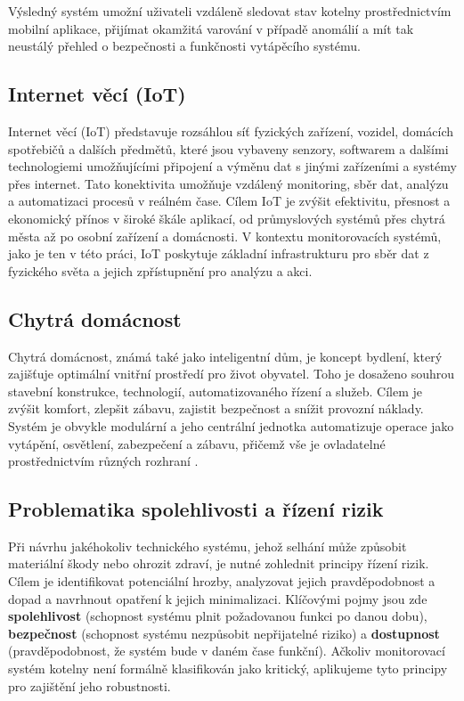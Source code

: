 \documentclass[12pt, twoside]{article} %
\begin{document}
Výsledný systém umožní uživateli vzdáleně sledovat stav kotelny prostřednictvím mobilní aplikace, přijímat okamžitá varování v případě anomálií a mít tak neustálý přehled o bezpečnosti a funkčnosti vytápěcího systému.

\subsection{Internet věcí (IoT)}
Internet věcí (IoT) představuje rozsáhlou síť fyzických zařízení, vozidel, domácích spotřebičů a dalších předmětů, které jsou vybaveny senzory, softwarem a dalšími technologiemi umožňujícími připojení a výměnu dat s jinými zařízeními a systémy přes internet. Tato konektivita umožňuje vzdálený monitoring, sběr dat, analýzu a automatizaci procesů v reálném čase. Cílem IoT je zvýšit efektivitu, přesnost a ekonomický přínos v široké škále aplikací, od průmyslových systémů přes chytrá města až po osobní zařízení a domácnosti. V kontextu monitorovacích systémů, jako je ten v této práci, IoT poskytuje základní infrastrukturu pro sběr dat z fyzického světa a jejich zpřístupnění pro analýzu a akci. \autocite{wiki:iot}

\subsection{Chytrá domácnost}
Chytrá domácnost, známá také jako inteligentní dům, je koncept bydlení, který zajišťuje optimální vnitřní prostředí pro život obyvatel. Toho je dosaženo souhrou stavební konstrukce, technologií, automatizovaného řízení a služeb. Cílem je zvýšit komfort, zlepšit zábavu, zajistit bezpečnost a snížit provozní náklady. Systém je obvykle modulární a jeho centrální jednotka automatizuje operace jako vytápění, osvětlení, zabezpečení a zábavu, přičemž vše je ovladatelné prostřednictvím různých rozhraní \autocite{wiki:inteligentni_dum}.

\subsection{Problematika spolehlivosti a řízení rizik}
Při návrhu jakéhokoliv technického systému, jehož selhání může způsobit materiální škody nebo ohrozit zdraví, je nutné zohlednit principy řízení rizik. Cílem je identifikovat potenciální hrozby, analyzovat jejich pravděpodobnost a dopad a navrhnout opatření k jejich minimalizaci. Klíčovými pojmy jsou zde \textbf{spolehlivost} (schopnost systému plnit požadovanou funkci po danou dobu), \textbf{bezpečnost} (schopnost systému nezpůsobit nepřijatelné riziko) a \textbf{dostupnost} (pravděpodobnost, že systém bude v daném čase funkční). Ačkoliv monitorovací systém kotelny není formálně klasifikován jako kritický, aplikujeme tyto principy pro zajištění jeho robustnosti.
\end{document}
